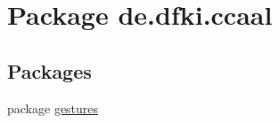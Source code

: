 \hypertarget{namespacede_1_1dfki_1_1ccaal}{\section{Package de.\-dfki.\-ccaal}
\label{namespacede_1_1dfki_1_1ccaal}
}
\subsection*{Packages}
\begin{DoxyCompactItemize}
\item 
package \hyperlink{namespacede_1_1dfki_1_1ccaal_1_1gestures}{gestures}
\end{DoxyCompactItemize}
